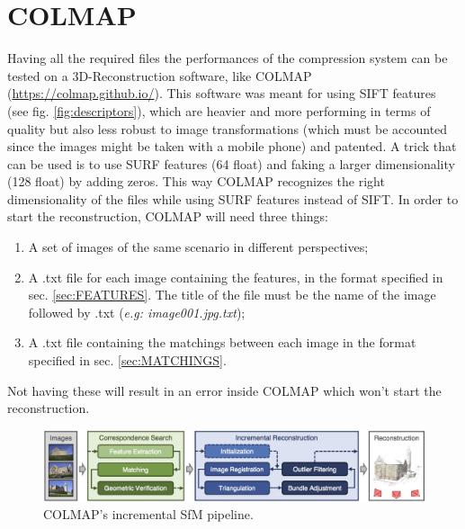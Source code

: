 
\section{COLMAP} \label{sec:COLMAP}
Having all the required files the performances of the compression system can be tested on a 3D-Reconstruction software, like COLMAP (\url{https://colmap.github.io/}). This software was meant for using SIFT features (see fig. \ref{fig:descriptors}), which are heavier and more performing in terms of quality but also less robust to image transformations (which must be accounted since the images might be taken with a mobile phone) and patented. A trick that can be used is to use SURF features (64 float) and faking a larger dimensionality (128 float) by adding zeros. This way COLMAP recognizes the right dimensionality of the files while using SURF features instead of SIFT. In order to start the reconstruction, COLMAP will need three things:
\begin{enumerate}
\item A set of images of the same scenario in different perspectives;
\item A .txt file for each image containing the features, in the format specified in sec. \ref{sec:FEATURES}. The title of the file must be the name of the image followed by .txt (\emph{e.g: image001.jpg.txt});
\item A .txt file containing the matchings between each image in the format specified in sec. \ref{sec:MATCHINGS}.
\end{enumerate}
Not having these will result in an error inside COLMAP which won't start the reconstruction.


\begin{figure}[h!]
    \centering
    \includegraphics[width=\textwidth]{images/colmap.png}
    \caption{COLMAP’s incremental SfM pipeline.}
    \label{fig:colmap}    
\end{figure}